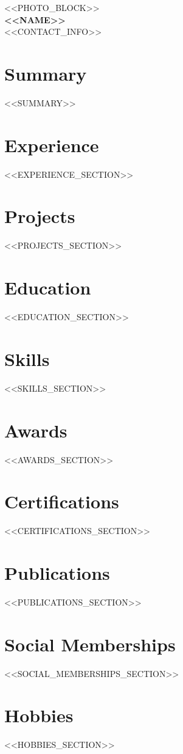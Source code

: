 \documentclass[<<FONT_SIZE>>,a4paper]{article}
\begin{document}
\begin{center}
    <<PHOTO_BLOCK>> \\
    \vspace{2mm}
    {\Huge \textbf{<<NAME>>}} \\
    \vspace{1mm}
    <<CONTACT_INFO>>
\end{center}

\section*{Summary}
<<SUMMARY>>

\section*{Experience}
<<EXPERIENCE_SECTION>>

\section*{Projects}
<<PROJECTS_SECTION>>

\section*{Education}
<<EDUCATION_SECTION>>

\section*{Skills}
<<SKILLS_SECTION>>

\section*{Awards}
<<AWARDS_SECTION>>

\section*{Certifications}
<<CERTIFICATIONS_SECTION>>

\section*{Publications}
<<PUBLICATIONS_SECTION>>

\section*{Social Memberships}
<<SOCIAL_MEMBERSHIPS_SECTION>>

\section*{Hobbies}
<<HOBBIES_SECTION>>
\end{document}
